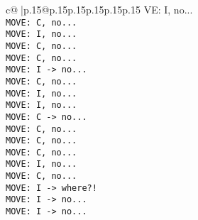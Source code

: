 \documentclass{article}
\begin{document}
{\begin{supertabular}{c@{$\;$}|p{.15\linewidth}@{}p{.15\linewidth}p{.15\linewidth}p{.15\linewidth}p{.15\linewidth}p{.15\linewidth}}
{{{VE: I, no...\\ \tt  MOVE: C, no...\\ \tt  MOVE: I, no...\\ \tt  MOVE: C, no...\\ \tt  MOVE: C, no...\\ \tt  MOVE: I -> no...\\ \tt  MOVE: C, no...\\ \tt  MOVE: I, no...\\ \tt  MOVE: I, no...\\ \tt  MOVE: C -> no...\\ \tt  MOVE: C, no...\\ \tt  MOVE: C, no...\\ \tt  MOVE: C, no...\\ \tt  MOVE: I, no...\\ \tt  MOVE: C, no...\\ \tt  MOVE: I -> where?!\\ \tt  MOVE: I -> no...\\ \tt  MOVE: I -> no...\\ }}}
\end{supertabular}}
\end{document}
